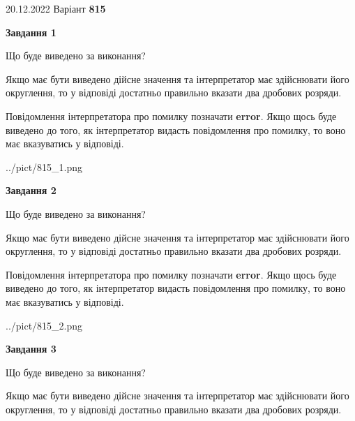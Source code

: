 \documentclass[12pt, ukrainian]{article}
\begin{document}
{20.12.2022 Варіант \No \textbf { 815 }\par}
{
\begin {Large}

{\begin {center}\textbf{Завдання 1}\end {center}}\par
Що буде виведено за виконання? \par

Якщо має бути виведено дійсне значення та інтерпретатор має здійснювати його округлення, 
то у відповіді достатньо правильно вказати два дробових розряди.

Повідомлення інтерпретатора про помилку позначати \textbf{error}.
Якщо щось буде виведено до того, як інтерпретатор видасть повідомлення про помилку, 
то воно має вказуватись у відповіді. \par

\begin{center}
	{../pict/815_1.png}
\end{center}
\newpage

{\begin {center}\textbf{Завдання 2}\end {center}}\par
Що буде виведено за виконання? \par

Якщо має бути виведено дійсне значення та інтерпретатор має здійснювати його округлення, 
то у відповіді достатньо правильно вказати два дробових розряди.

Повідомлення інтерпретатора про помилку позначати \textbf{error}.
Якщо щось буде виведено до того, як інтерпретатор видасть повідомлення про помилку, 
то воно має вказуватись у відповіді. \par

\begin{center}
	{../pict/815_2.png}
\end{center}
\newpage

{\begin {center}\textbf{Завдання 3}\end {center}}\par
Що буде виведено за виконання? \par

Якщо має бути виведено дійсне значення та інтерпретатор має здійснювати його округлення, 
то у відповіді достатньо правильно вказати два дробових розряди.


\end{Large}}
\end{document}
